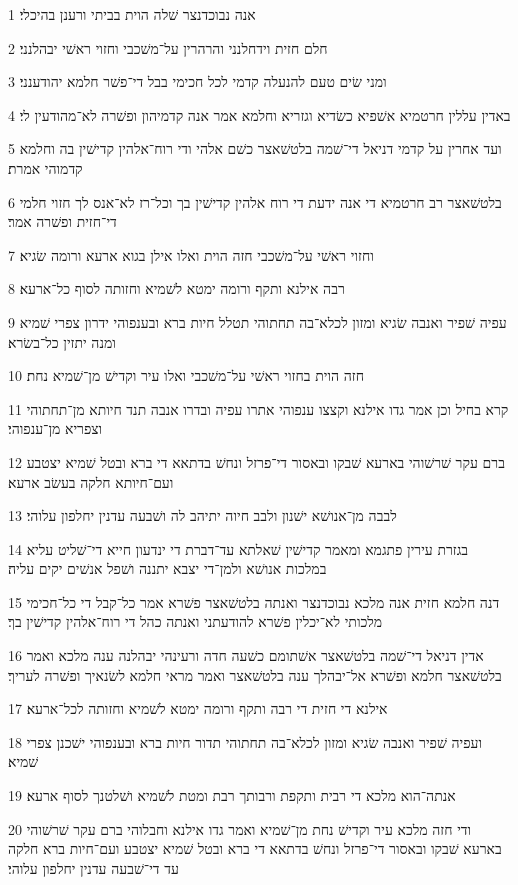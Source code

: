 \par 1 אנה נבוכדנצר שׁלה הוית בביתי ורענן בהיכלי׃
\par 2 חלם חזית וידחלנני והרהרין על־משׁכבי וחזוי ראשׁי יבהלנני׃
\par 3 ומני שׂים טעם להנעלה קדמי לכל חכימי בבל די־פשׁר חלמא יהודענני׃
\par 4 באדין עללין חרטמיא אשׁפיא כשׂדיא וגזריא וחלמא אמר אנה קדמיהון ופשׁרה לא־מהודעין לי׃
\par 5 ועד אחרין על קדמי דניאל די־שׁמה בלטשׁאצר כשׁם אלהי ודי רוח־אלהין קדישׁין בה וחלמא קדמוהי אמרת׃
\par 6 בלטשׁאצר רב חרטמיא די אנה ידעת די רוח אלהין קדישׁין בך וכל־רז לא־אנס לך חזוי חלמי די־חזית ופשׁרה אמר׃
\par 7 וחזוי ראשׁי על־משׁכבי חזה הוית ואלו אילן בגוא ארעא ורומה שׂגיא׃
\par 8 רבה אילנא ותקף ורומה ימטא לשׁמיא וחזותה לסוף כל־ארעא׃
\par 9 עפיה שׁפיר ואנבה שׂגיא ומזון לכלא־בה תחתוהי תטלל חיות ברא ובענפוהי ידרון צפרי שׁמיא ומנה יתזין כל־בשׂרא׃
\par 10 חזה הוית בחזוי ראשׁי על־משׁכבי ואלו עיר וקדישׁ מן־שׁמיא נחת׃
\par 11 קרא בחיל וכן אמר גדו אילנא וקצצו ענפוהי אתרו עפיה ובדרו אנבה תנד חיותא מן־תחתוהי וצפריא מן־ענפוהי׃
\par 12 ברם עקר שׁרשׁוהי בארעא שׁבקו ובאסור די־פרזל ונחשׁ בדתאא די ברא ובטל שׁמיא יצטבע ועם־חיותא חלקה בעשׂב ארעא׃
\par 13 לבבה מן־אנושׁא ישׁנון ולבב חיוה יתיהב לה ושׁבעה עדנין יחלפון עלוהי׃
\par 14 בגזרת עירין פתגמא ומאמר קדישׁין שׁאלתא עד־דברת די ינדעון חייא די־שׁליט עליא במלכות אנושׁא ולמן־די יצבא יתננה ושׁפל אנשׁים יקים עליה׃
\par 15 דנה חלמא חזית אנה מלכא נבוכדנצר ואנתה בלטשׁאצר פשׁרא אמר כל־קבל די כל־חכימי מלכותי לא־יכלין פשׁרא להודעתני ואנתה כהל די רוח־אלהין קדישׁין בך׃
\par 16 אדין דניאל די־שׁמה בלטשׁאצר אשׁתומם כשׁעה חדה ורעינהי יבהלנה ענה מלכא ואמר בלטשׁאצר חלמא ופשׁרא אל־יבהלך ענה בלטשׁאצר ואמר מראי חלמא לשׂנאיך ופשׁרה לעריך׃
\par 17 אילנא די חזית די רבה ותקף ורומה ימטא לשׁמיא וחזותה לכל־ארעא׃
\par 18 ועפיה שׁפיר ואנבה שׂגיא ומזון לכלא־בה תחתוהי תדור חיות ברא ובענפוהי ישׁכנן צפרי שׁמיא׃
\par 19 אנתה־הוא מלכא די רבית ותקפת ורבותך רבת ומטת לשׁמיא ושׁלטנך לסוף ארעא׃
\par 20 ודי חזה מלכא עיר וקדישׁ נחת מן־שׁמיא ואמר גדו אילנא וחבלוהי ברם עקר שׁרשׁוהי בארעא שׁבקו ובאסור די־פרזל ונחשׁ בדתאא די ברא ובטל שׁמיא יצטבע ועם־חיות ברא חלקה עד די־שׁבעה עדנין יחלפון עלוהי׃

